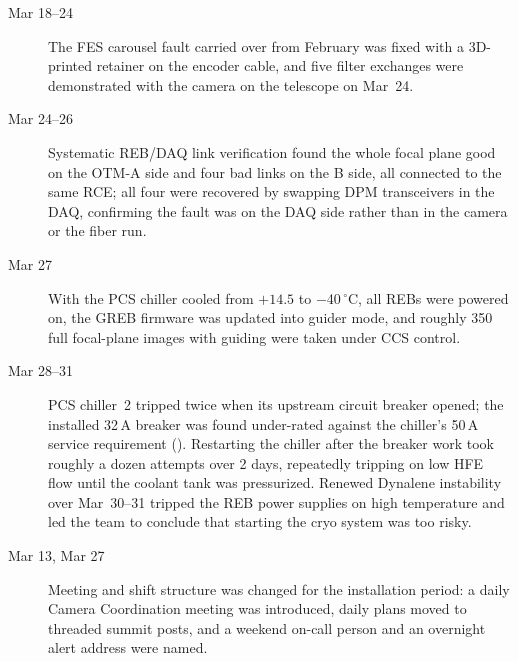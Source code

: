 \begin{description}
\item[Mar 18--24] The FES carousel fault carried over from February
  was fixed with a 3D-printed retainer on the encoder cable, and five
  filter exchanges were demonstrated with the camera on the telescope
  on Mar~24.

\item[Mar 24--26] Systematic REB/DAQ link verification found the whole
  focal plane good on the OTM-A side and four bad links on the B side,
  all connected to the same RCE; all four were recovered by swapping
  DPM transceivers in the DAQ, confirming the fault was on the DAQ
  side rather than in the camera or the fiber run.

\item[Mar 27] With the PCS chiller cooled from $+14.5$ to
  $-$40\,$^{\circ}$C, all REBs were powered on, the GREB firmware was
  updated into guider mode, and roughly 350 full focal-plane images
  with guiding were taken under CCS control.

\item[Mar 28--31] PCS chiller~2 tripped twice when its upstream
  circuit breaker opened; the installed 32\,A breaker was found
  under-rated against the chiller's 50\,A service requirement
  ().  Restarting the chiller after the breaker work took
  roughly a dozen attempts over 2 days, repeatedly tripping on low
  HFE flow until the coolant tank was pressurized.  Renewed Dynalene
  instability over Mar~30--31 tripped the REB power supplies on high
  temperature and led the team to conclude that starting the cryo
  system was too risky.

\item[Mar 13, Mar 27] Meeting and shift structure was changed for the
  installation period: a daily Camera Coordination meeting was
  introduced, daily plans moved to threaded summit posts, and a
  weekend on-call person and an overnight alert address were named.
\end{description}

